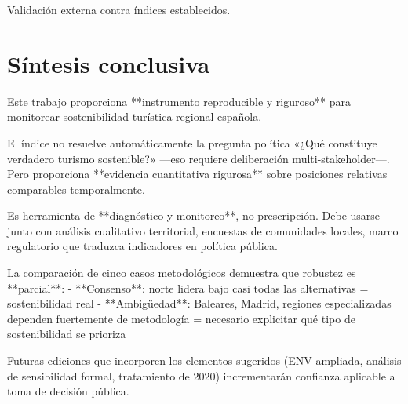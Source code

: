 Validación externa contra índices establecidos.

\section{Síntesis conclusiva}

Este trabajo proporciona **instrumento reproducible y riguroso** para monitorear sostenibilidad turística regional española.

El índice no resuelve automáticamente la pregunta política «¿Qué constituye verdadero turismo sostenible?» —eso requiere deliberación multi-stakeholder—. Pero proporciona **evidencia cuantitativa rigurosa** sobre posiciones relativas comparables temporalmente.

Es herramienta de **diagnóstico y monitoreo**, no prescripción. Debe usarse junto con análisis cualitativo territorial, encuestas de comunidades locales, marco regulatorio que traduzca indicadores en política pública.

La comparación de cinco casos metodológicos demuestra que robustez es **parcial**:
- **Consenso**: norte lidera bajo casi todas las alternativas = sostenibilidad real
- **Ambigüedad**: Baleares, Madrid, regiones especializadas dependen fuertemente de metodología = necesario explicitar qué tipo de sostenibilidad se prioriza

Futuras ediciones que incorporen los elementos sugeridos (ENV ampliada, análisis de sensibilidad formal, tratamiento de 2020) incrementarán confianza aplicable a toma de decisión pública.


